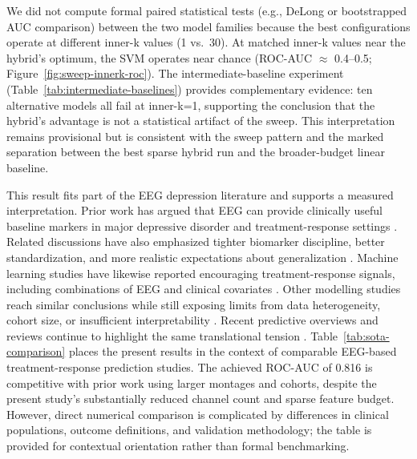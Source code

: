 We did not compute formal paired statistical tests (e.g., DeLong or bootstrapped AUC comparison) between the two model families because the best configurations operate at different inner-k values (1 vs.\ 30). At matched inner-k values near the hybrid's optimum, the SVM operates near chance (ROC-AUC $\approx$ 0.4--0.5; Figure~\ref{fig:sweep-innerk-roc}). The intermediate-baseline experiment (Table~\ref{tab:intermediate-baselines}) provides complementary evidence: ten alternative models all fail at inner-k=1, supporting the conclusion that the hybrid's advantage is not a statistical artifact of the sweep. This interpretation remains provisional but is consistent with the sweep pattern and the marked separation between the best sparse hybrid run and the broader-budget linear baseline.

This result fits part of the EEG depression literature and supports a measured interpretation. Prior work has argued that EEG can provide clinically useful baseline markers in major depressive disorder and treatment-response settings \citep{olbrich2013_eeg,olbrich2015_personalized,leuchter2010_biomarkers}. Related discussions have also emphasized tighter biomarker discipline, better standardization, and more realistic expectations about generalization \citep{Fu2019,simmatis2023_technical,Moncy2025BD}. Machine learning studies have likewise reported encouraging treatment-response signals, including combinations of EEG and clinical covariates \citep{AlKaysi2017,jaworska2019_leveraging,oakley2022_eeg}. Other modelling studies reach similar conclusions while still exposing limits from data heterogeneity, cohort size, or insufficient interpretability \citep{shalbaf2018_nonlinear,ebrahimzadeh2021_predicting,zhdanov_svm_prediction}. Recent predictive overviews and reviews continue to highlight the same translational tension \citep{watts2022predicting,cohen2023electroencephalography}. Table~\ref{tab:sota-comparison} places the present results in the context of comparable EEG-based treatment-response prediction studies. The achieved ROC-AUC of 0.816 is competitive with prior work using larger montages and cohorts, despite the present study's substantially reduced channel count and sparse feature budget. However, direct numerical comparison is complicated by differences in clinical populations, outcome definitions, and validation methodology; the table is provided for contextual orientation rather than formal benchmarking.

\begin{paperwidetable}
  \centering
  \caption{Comparison with selected EEG-based treatment-response prediction studies in depression.}
  \label{tab:sota-comparison}
  \footnotesize
  
\end{paperwidetable}

